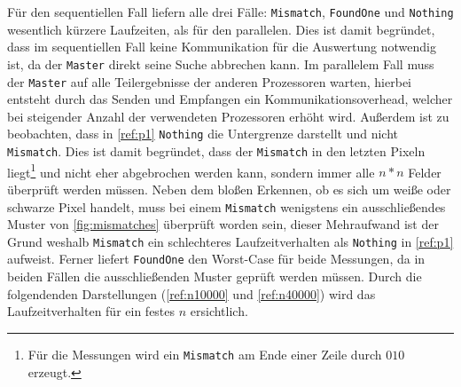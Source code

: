 Für den sequentiellen Fall liefern alle drei Fälle: \texttt{Mismatch}, \texttt{FoundOne} und \texttt{Nothing} wesentlich kürzere Laufzeiten, als für den parallelen. 
Dies ist damit begründet, dass im sequentiellen Fall keine Kommunikation für die Auswertung notwendig ist, da der \texttt{Master} direkt seine Suche abbrechen kann. 
Im parallelem Fall muss der \texttt{Master} auf alle Teilergebnisse der anderen Prozessoren warten, hierbei entsteht durch das Senden und Empfangen ein Kommunikationsoverhead, welcher bei steigender Anzahl der verwendeten Prozessoren erhöht wird.
Außerdem ist zu beobachten, dass in \autoref{ref:p1} \texttt{Nothing} die Untergrenze darstellt und nicht \texttt{Mismatch}. Dies ist damit begründet, dass der \texttt{Mismatch} in den letzten Pixeln liegt\footnote{Für die Messungen wird ein \texttt{Mismatch} am Ende einer Zeile durch $0 1 0$ erzeugt.} und nicht eher abgebrochen werden kann, sondern immer alle $n*n$ Felder überprüft werden müssen. 
Neben dem bloßen Erkennen, ob es sich um weiße oder schwarze Pixel handelt, muss bei einem \texttt{Mismatch} wenigstens ein ausschließendes Muster von \autoref{fig:mismatches} überprüft worden sein, dieser Mehraufwand ist der Grund weshalb \texttt{Mismatch} ein schlechteres Laufzeitverhalten als \texttt{Nothing} in \autoref{ref:p1} aufweist.
Ferner liefert \texttt{FoundOne} den Worst-Case für beide Messungen, da in beiden Fällen die ausschließenden Muster geprüft werden müssen. 
Durch die folgendenden Darstellungen (\autoref{ref:n10000} und \autoref{ref:n40000}) wird das Laufzeitverhalten für ein festes $n$ ersichtlich.
